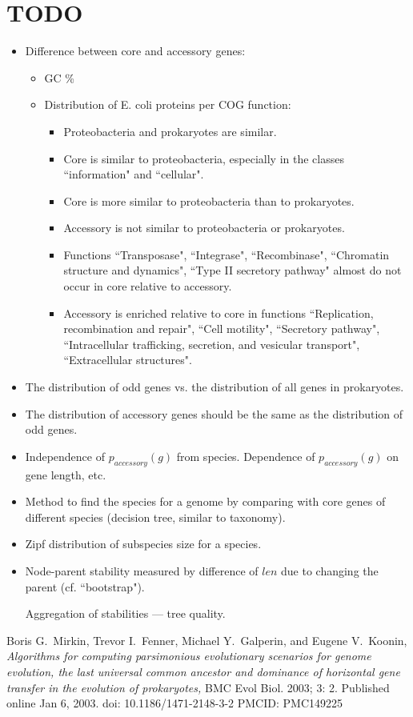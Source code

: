\documentclass[10pt,a4paper]{article}
\theoremstyle{plain} \newtheorem{Lem}{Lemma}
\begin{document}
\section{TODO}

\begin{itemize}
  \item Difference between core and accessory genes:
    \begin{itemize}
   	  \item GC \%
	  \item Distribution of E. coli proteins per COG function:
	  \begin{itemize}
    	  \item Proteobacteria and prokaryotes are similar.
    	  \item Core is similar to proteobacteria, especially in the classes ``information" and ``cellular".
    	  \item Core is more similar to proteobacteria than to prokaryotes.
    	  \item Accessory is not similar to proteobacteria or prokaryotes.
    	  \item Functions ``Transposase", ``Integrase", ``Recombinase", ``Chromatin structure and dynamics", ``Type II secretory pathway" almost do not occur in core relative to accessory.
    	  \item Accessory is enriched relative to core in functions ``Replication, recombination and repair", ``Cell motility", ``Secretory pathway", ``Intracellular trafficking, secretion, and vesicular transport", ``Extracellular structures".
	  \end{itemize}
    \end{itemize}
 	\item The distribution of odd genes vs. the distribution of all genes in prokaryotes.
 	\item The distribution of accessory genes should be the same as the distribution of odd genes.
 	\item Independence of $p_{accessory}(g)$ from species. Dependence of $p_{accessory}(g)$ on gene length, etc.
	\item Method to find the species for a genome by comparing with core genes of different species (decision tree, similar to taxonomy).
    \item Zipf distribution of subspecies size for a species.
    \item Node-parent stability measured by difference of $len$ due to changing the parent (cf. ``bootstrap"). 
          \par Aggregation of stabilities --- tree quality.
\end{itemize}


\begin{thebibliography}{9}

Boris G.~Mirkin, Trevor I.~Fenner, Michael Y.~Galperin, and Eugene V.~Koonin, 
\emph{Algorithms for computing parsimonious evolutionary scenarios for genome evolution, the last universal common ancestor and dominance of horizontal gene transfer in the evolution of prokaryotes,}
BMC Evol Biol. 2003; 3: 2.
Published online Jan 6, 2003. doi:  10.1186/1471-2148-3-2
PMCID: PMC149225

\end{thebibliography}
\end{document}
